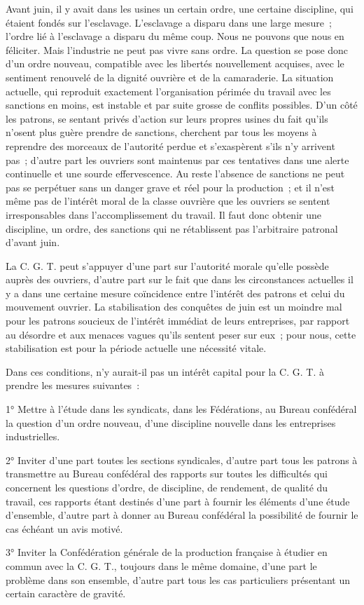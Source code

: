 \documentclass[french,twoside]{book} %
\begin{document}
Avant juin, il y avait dans les usines un certain ordre, une certaine discipline, qui étaient fondés sur l'esclavage. L'esclavage a disparu dans une large mesure ; l'ordre lié à l'esclavage a disparu du même coup. Nous ne pouvons que nous en féliciter. Mais l'industrie ne peut pas vivre sans ordre. La question se pose donc d'un ordre nouveau, compatible avec les libertés nouvellement acquises, avec le sentiment renouvelé de la dignité ouvrière et de la camaraderie. La situation actuelle, qui reproduit exactement l'organisation périmée du travail avec les sanctions en moins, est instable et par suite grosse de conflits possibles. D'un côté les patrons, se sentant privés d'action sur leurs propres usines du fait qu'ils n'osent plus guère prendre de sanctions, cherchent par tous les moyens à reprendre des morceaux de l'autorité perdue et s'exaspèrent s'ils n'y arrivent pas ; d'autre part les ouvriers sont maintenus par ces tentatives dans une alerte continuelle et une sourde effervescence. Au reste l'absence de sanctions ne peut pas se perpétuer sans un danger grave et réel pour la production ; et il n'est même pas de l'intérêt moral de la classe ouvrière que les ouvriers se sentent irresponsables dans l'accomplissement du travail. Il faut donc obtenir une discipline, un ordre, des sanctions qui ne rétablissent pas l'arbitraire patronal d'avant juin.\par
La C. G. T. peut s'appuyer d'une part sur l'autorité morale qu'elle possède auprès des ouvriers, d'autre part sur le fait que dans les circonstances actuelles il y a dans une certaine mesure coïncidence entre l'intérêt des patrons et celui du mouvement ouvrier. La stabilisation des conquêtes de juin est un moindre mal pour les patrons soucieux de l'intérêt immédiat de leurs entreprises, par rapport au désordre et aux menaces vagues qu'ils sentent peser sur eux ; pour nous, cette stabilisation est pour la période actuelle une nécessité vitale.\par
Dans ces conditions, n'y aurait-il pas un intérêt capital pour la C. G. T. à prendre les mesures suivantes :\par
1° Mettre à l'étude dans les syndicats, dans les Fédérations, au Bureau confédéral la question d'un ordre nouveau, d'une discipline nouvelle dans les entreprises industrielles.\par
2° Inviter d'une part toutes les sections syndicales, d'autre part tous les patrons à transmettre au Bureau confédéral des rapports sur toutes les difficultés qui concernent les questions d'ordre, de discipline, de rendement, de qualité du travail, ces rapports étant destinés d'une part à fournir les éléments d'une étude d'ensemble, d'autre part à donner au Bureau confédéral la possibilité de fournir le cas échéant un avis motivé.\par
3° Inviter la Confédération générale de la production française à étudier en commun avec la C. G. T., toujours dans le même domaine, d'une part le problème dans son ensemble, d'autre part tous les cas particuliers présentant un certain caractère de gravité.
\end{document}
